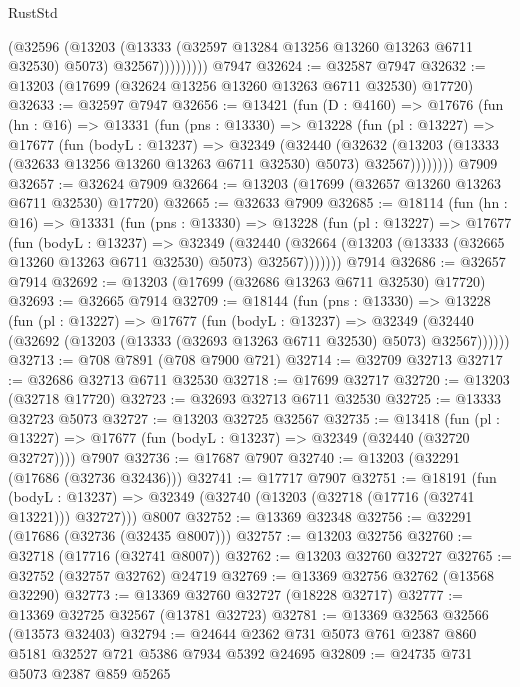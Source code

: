 \begin{lexlean}{RustStd}
\begin{coremodule}
                  (@32596
                    (@13203
                      (@13333 (@32597 @13284 @13256 @13260 @13263 @6711 @32530) @5073)
                      @32567)))))))))
    @7947
@32624 := @32587 @7947
@32632 := @13203 (@17699 (@32624 @13256 @13260 @13263 @6711 @32530) @17720)
@32633 := @32597 @7947
@32656 := @13421
    (fun (D : @4160) =>
    @17676
      (fun (hn : @16) =>
      @13331
        (fun (pns : @13330) =>
        @13228
          (fun (pl : @13227) =>
          @17677
            (fun (bodyL : @13237) =>
            @32349
              (@32440
                (@32632
                  (@13203 (@13333 (@32633 @13256 @13260 @13263 @6711 @32530) @5073) @32567))))))))
    @7909
@32657 := @32624 @7909
@32664 := @13203 (@17699 (@32657 @13260 @13263 @6711 @32530) @17720)
@32665 := @32633 @7909
@32685 := @18114
    (fun (hn : @16) =>
    @13331
      (fun (pns : @13330) =>
      @13228
        (fun (pl : @13227) =>
        @17677
          (fun (bodyL : @13237) =>
          @32349
            (@32440 (@32664 (@13203 (@13333 (@32665 @13260 @13263 @6711 @32530) @5073) @32567)))))))
    @7914
@32686 := @32657 @7914
@32692 := @13203 (@17699 (@32686 @13263 @6711 @32530) @17720)
@32693 := @32665 @7914
@32709 := @18144
    (fun (pns : @13330) =>
    @13228
      (fun (pl : @13227) =>
      @17677
        (fun (bodyL : @13237) =>
        @32349 (@32440 (@32692 (@13203 (@13333 (@32693 @13263 @6711 @32530) @5073) @32567))))))
@32713 := @708 @7891 (@708 @7900 @721)
@32714 := @32709 @32713
@32717 := @32686 @32713 @6711 @32530
@32718 := @17699 @32717
@32720 := @13203 (@32718 @17720)
@32723 := @32693 @32713 @6711 @32530
@32725 := @13333 @32723 @5073
@32727 := @13203 @32725 @32567
@32735 := @13418
    (fun (pl : @13227) => @17677 (fun (bodyL : @13237) => @32349 (@32440 (@32720 @32727))))
    @7907
@32736 := @17687 @7907
@32740 := @13203 (@32291 (@17686 (@32736 @32436)))
@32741 := @17717 @7907
@32751 := @18191
    (fun (bodyL : @13237) => @32349 (@32740 (@13203 (@32718 (@17716 (@32741 @13221))) @32727)))
    @8007
@32752 := @13369 @32348
@32756 := @32291 (@17686 (@32736 (@32435 @8007)))
@32757 := @13203 @32756
@32760 := @32718 (@17716 (@32741 @8007))
@32762 := @13203 @32760 @32727
@32765 := @32752 (@32757 @32762) @24719
@32769 := @13369 @32756 @32762 (@13568 @32290)
@32773 := @13369 @32760 @32727 (@18228 @32717)
@32777 := @13369 @32725 @32567 (@13781 @32723)
@32781 := @13369 @32563 @32566 (@13573 @32403)
@32794 := @24644 @2362 @731 @5073 @761 @2387 @860 @5181 @32527 @721 @5386 @7934 @5392 @24695
@32809 := @24735
    @731
    @5073
    @2387
    @859
    @5265

\end{coremodule}
\end{lexlean}
